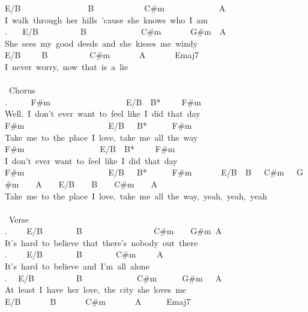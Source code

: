 {E/B\ \ \ \ \ \ \ \ \ \ \ \ \ \ \ \ B\ \ \ \ \ \ \ \ \ \ \ \ C\#m\ \ \ \ \ \ \ \ \ \ \ \ \ A\\
I\ walk\ through\ her\ hills\ 'cause\ she\ knows\ who\ I\ am\\
. \ \ \ E/B\ \ \ \ \ \ \ \ \ \ B\ \ \ \ \ \ \ \ \ \ \ \ \ C\#m\ \ \ \ \ \ \ G\#m\ \ A\\
She\ sees\ my\ good\ deeds\ and\ she\ kisses\ me\ windy\\
E/B\ \ \ \ \ B\ \ \ \ \ \ \ \ \ \ C\#m\ \ \ \ \ \ \ A\ \ \ \ \ \ \ Emaj7\\
I\ never\ worry,\ now\ that\ is\ a\ lie\\
\\
\lbrack\ Chorus\rbrack\\
. \ \ \ \ \ F\#m\ \ \ \ \ \ \ \ \ \ \ \ \ \ \ \ \ \ E/B\ \ B*\ \ \ \ \ F\#m\\
Well,\ I\ don't\ ever\ want\ to\ feel\ like\ I\ did\ that\ day\\
F\#m\ \ \ \ \ \ \ \ \ \ \ \ \ \ \ \ \ \ \ \ E/B\ \ \ B*\ \ \ \ \ \ F\#m\\
Take\ me\ to\ the\ place\ I\ love,\ take\ me\ all\ the\ way\\
F\#m\ \ \ \ \ \ \ \ \ \ \ \ \ \ \ \ \ \ E/B\ \ B*\ \ \ \ \ F\#m\\
I\ don't\ ever\ want\ to\ feel\ like\ I\ did\ that\ day\\
F\#m\ \ \ \ \ \ \ \ \ \ \ \ \ \ \ \ \ \ \ \ E/B\ \ \ B*\ \ \ \ \ \ F\#m\ \ \ \ \ \ \ E/B\ \ B\ \ \ C\#m\ \ \ G\#m\ \ \ \ A\ \ \ \ E/B\ \ \ \ B\ \ \ \ C\#m\ \ \ \ A\\
Take\ me\ to\ the\ place\ I\ love,\ take\ me\ all\ the\ way,\ yeah,\ yeah,\ yeah\\
\\
\lbrack\ Verse\rbrack\\
. \ \ \ \ E/B\ \ \ \ \ \ \ \ B\ \ \ \ \ \ \ \ \ \ \ \ \ \ \ \ \ C\#m\ \ \ \ G\#m\ A\\
It's\ hard\ to\ believe\ that\ there's\ nobody\ out\ there\\
. \ \ \ \ E/B\ \ \ \ \ \ \ \ B\ \ \ \ \ \ \ \ C\#m\ \ \ \ \ A\\
It's\ hard\ to\ believe\ and\ I'm\ all\ alone\\
. \ \ E/B\ \ \ \ \ \ \ \ \ \ B\ \ \ \ \ \ \ \ \ \ \ \ \ C\#m\ \ \ \ \ \ G\#m\ \ \ A\\
At\ least\ I\ have\ her\ love,\ the\ city\ she\ loves\ me\\
E/B\ \ \ \ \ \ \ B\ \ \ \ \ \ \ C\#m\ \ \ \ \ \ \ A\ \ \ \ \ \ Emaj7\\
}

